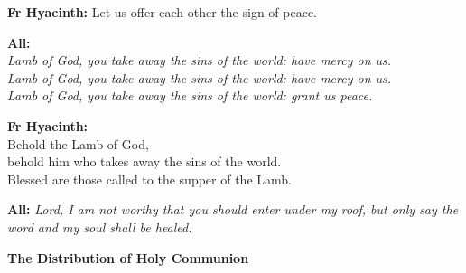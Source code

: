 \documentclass[12pt,landscape]{article}
\begin{document}
\begin{multicols}{2}
\textbf{Fr Hyacinth:} Let us offer each other the sign of peace.

\vspace{1em}
\textbf{All:}\\
\textit{Lamb of God, you take away the sins of the world: have mercy on us.\\
Lamb of God, you take away the sins of the world: have mercy on us.\\
Lamb of God, you take away the sins of the world: grant us peace.}

\vspace{1em}
\textbf{Fr Hyacinth:}\\
Behold the Lamb of God,\\
behold him who takes away the sins of the world.\\
Blessed are those called to the supper of the Lamb.

\vspace{0.5em}
\textbf{All:} \textit{Lord, I am not worthy that you should enter under my roof, but only say the word and my soul shall be healed.}

\vspace{1em}
\textbf{The Distribution of Holy Communion}

\end{multicols}
\end{document}
